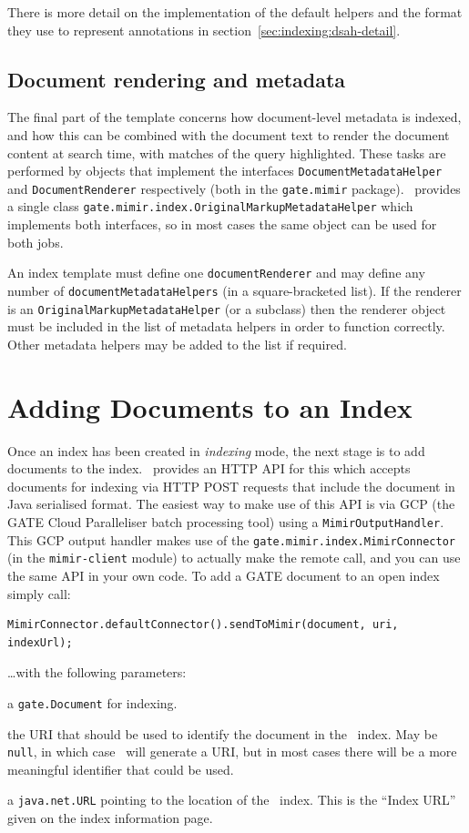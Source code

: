 There is more detail on the implementation of the default helpers and the
format they use to represent annotations in
section~\ref{sec:indexing:dsah-detail}.

\subsection*{Document rendering and metadata}

The final part of the template concerns how document-level metadata is indexed,
and how this can be combined with the document text to render the document
content at search time, with matches of the query highlighted.  These tasks are
performed by objects that implement the interfaces
\lstinline!DocumentMetadataHelper! and \lstinline!DocumentRenderer!
respectively (both in the \lstinline!gate.mimir! package). \Mimir\ provides a
single class \lstinline!gate.mimir.index.OriginalMarkupMetadataHelper!
which implements both interfaces, so in most cases the same object can be used
for both jobs.

An index template must define one \lstinline!documentRenderer! and may define
any number of \lstinline!documentMetadataHelpers! (in a square-bracketed list).
If the renderer is an \lstinline!OriginalMarkupMetadataHelper! (or a subclass)
then the renderer object must be included in the list of metadata helpers in
order to function correctly.  Other metadata helpers may be added to the list
if required.

\section{Adding Documents to an Index}\label{sec:indexing:add-docs}

Once an index has been created in {\em indexing} mode, the next stage is to add
documents to the index.  \Mimir\ provides an HTTP API for this which accepts
documents for indexing via HTTP POST requests that include the document in Java
serialised format.  The easiest way to make use of this API is via GCP (the
GATE Cloud Paralleliser batch processing tool) using a
\lstinline!MimirOutputHandler!.  This GCP output handler makes use of the
\lstinline!gate.mimir.index.MimirConnector! (in the {\tt mimir-client} module)
to actually make the remote call, and you can use the same API in your own
code.  To add a GATE document to an open index simply call:
\begin{lstlisting}[breaklines]
MimirConnector.defaultConnector().sendToMimir(document, uri, indexUrl);
\end{lstlisting}
%
\ldots{}with the following parameters:
\bde
\item[document] a \lstinline!gate.Document! for indexing.
\item[uri] the URI that should be used to identify the document in the \Mimir\
  index.  May be \lstinline!null!, in which case \Mimir\ will generate a URI,
  but in most cases there will be a more meaningful identifier that could be
  used.
\item[indexUrl] a \lstinline!java.net.URL! pointing to the location of the
  \Mimir\ index.  This is the ``Index URL'' given on the index information page.
\ede

